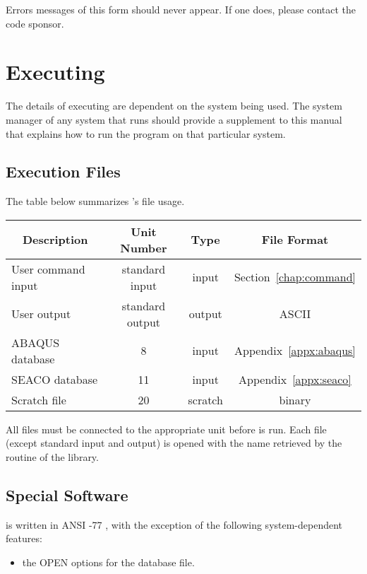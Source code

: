 {
Errors messages of this form should never appear. If one does, please
contact the code sponsor.
}

\chapter{Executing \caps{\PROGRAM}} \label{chap:exec}

The details of executing \caps{\PROGRAM} are dependent on the system
being used. The system manager of any system that runs \caps{\PROGRAM}
should provide a supplement to this manual that explains how to run the
program on that particular system.

\section{Execution Files} \label{exec:files}

The table below summarizes \caps{\PROGRAM}'s file usage.

\begin{center} \begin{tabular}{||l|c|c|c||}
\hline
\multicolumn{1}{||c}{Description} &
\multicolumn{1}{|c}{Unit Number} &
\multicolumn{1}{|c}{Type} &
\multicolumn{1}{|c||}{File Format} \\
\hline
User command input & standard input & input & Section~\ref{chap:command}
\\
User output & standard output & output & ASCII \\
ABAQUS database & 8 & input & Appendix~\ref{appx:abaqus} \\
SEACO database & 11 & input & Appendix~\ref{appx:seaco} \\
Scratch file & 20 & scratch & binary \\
\hline
\end{tabular} \end{center}

All files must be connected to the appropriate unit before
\caps{\PROGRAM} is run. Each file (except standard input and output) is
opened with the name retrieved by the  routine of the
 library.

\section{Special Software}

\caps{\PROGRAM} is written in ANSI -77 \cite{bib:f77},
with the exception of the following system-dependent features:
\setlength{\itemsep}{\medskipamount} \begin{itemize}
\item the OPEN options for the  database file.
\end{itemize}

